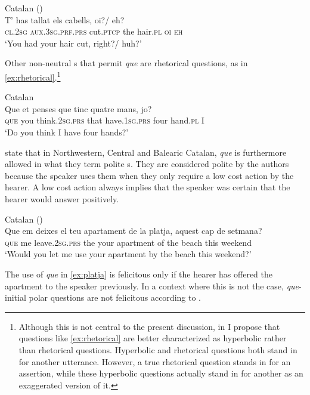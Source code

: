\ea\label{ex:cabells}
Catalan (\citealt[ex 19]{Castroviejo2018})\\
\gll T' has tallat els cabells, oi?/ eh? \\
\textsc{cl.2sg} \textsc{aux.3sg.prf.prs} cut.\textsc{ptcp} the hair.\textsc{pl} \textsc{oi} \textsc{eh}\\
\glt `You had your hair cut, right?/ huh?'
\z


Other non-neutral s that permit \emph{que} are rhetorical questions, as in \eqref{ex:rhetorical}.\footnote{Although this is not central to the present discussion, in \citet{Kocher2017a} I propose that questions like \eqref{ex:rhetorical} are better characterized as hyperbolic rather than rhetorical questions. Hyperbolic and rhetorical questions both  stand in for another utterance. However, a true rhetorical question stands in for an assertion, while these hyperbolic questions actually stand in for another  as an exaggerated  version of it.}  

\ea\label{ex:rhetorical} Catalan \citep[18: 36b]{PrietoRigau2007}\\
  \gll 	Que et penses que tinc quatre mans, jo?\\
	\textsc{que} you think.\textsc{2sg.prs} that have.\textsc{1sg.prs} four hand.\textsc{pl} I\\
	\glt `Do you think I have four hands?' 
\z


 \citet{PrietoRigau2007} state that in   Northwestern, Central and Balearic Catalan, \emph{que} is furthermore allowed in what they term polite s. They are considered polite by the authors because the speaker  uses them when  they only require a low cost action by the hearer. A low cost action always implies that the speaker was certain that the hearer would answer positively.  
 
\ea\label{ex:platja}
Catalan (\citealt[4: ex 8a]{PrietoRigau2007})\\
\gll Que em deixes el teu apartament de la platja, aquest {cap de setmana}?\\
	\textsc{que} me leave.\textsc{2sg.prs} the your apartment of the beach this weekend\\
	\glt `Would you let me use your apartment by the beach this weekend?'
	\z
 
The use of \emph{que} in \eqref{ex:platja} is  felicitous only if the hearer has offered the  apartment to the speaker previously. In a context where this is not the case, \emph{que}-initial polar questions are not felicitous according to \citet{PrietoRigau2007}. 

